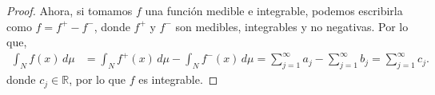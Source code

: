 \begin{itemize}
\begin{itemize}
\begin{proof}
Ahora, si tomamos \( f \) una función medible e integrable, podemos escribirla como \( f = f^+ - f^- \), donde \( f^+ \) y \( f^- \) son medibles, integrables y no negativas. Por lo que,
\begin{align*}
 \int_N f(x) \, d\mu &= \int_N f^+(x) \, d\mu - \int_N f^-(x) \, d\mu = \sum_{j=1}^{\infty} a_j - \sum_{j=1}^{\infty} b_j = \sum_{j=1}^{\infty} c_j 
.\end{align*}
donde $c_j \in \mathbb{R}$, por lo que  $f$ es integrable.


    
\end{proof}

\end{itemize}
\end{itemize}